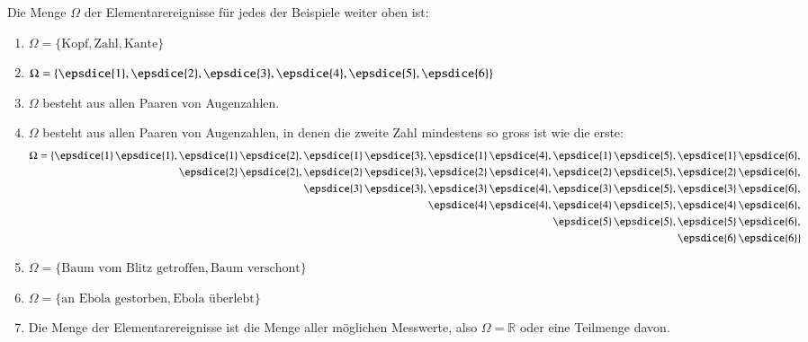 Die Menge $\Omega$ der Elementarereignisse für jedes der Beispiele weiter
oben ist:
\begin{enumerate}
\item $\Omega=\{\text{Kopf},\text{Zahl},\text{Kante}\}$
\item $\Omega=\{\epsdice{1},
\epsdice{2},
\epsdice{3},
\epsdice{4},
\epsdice{5},
\epsdice{6}\}$
\item $\Omega$ besteht aus allen Paaren von Augenzahlen.
\item $\Omega$ besteht aus allen Paaren von Augenzahlen, in denen die
zweite Zahl mindestens so gross ist wie die erste:
{
\def\e#1#2{\epsdice{#1}\,\epsdice{#2}}
\def\p{\phantom{\epsdice{1}\,\epsdice{1},\,}}
\begin{align*}
\Omega=\{
           &\e{1}{1},\e{1}{2},\e{1}{3},\e{1}{4},\e{1}{5},\e{1}{6},\\
           &\p       \e{2}{2},\e{2}{3},\e{2}{4},\e{2}{5},\e{2}{6},\\
           &\p       \p       \e{3}{3},\e{3}{4},\e{3}{5},\e{3}{6},\\
           &\p       \p       \p       \e{4}{4},\e{4}{5},\e{4}{6},\\
           &\p       \p       \p       \p       \e{5}{5},\e{5}{6},\\
           &\p       \p       \p       \p       \p       \e{6}{6}
\}
\end{align*}
}
\item $\Omega=\{\text{Baum vom Blitz getroffen},\text{Baum verschont}\}$
\item $\Omega=\{\text{an Ebola gestorben},\text{Ebola überlebt}\}$
\item Die Menge der Elementarereignisse ist die Menge aller möglichen
Messwerte, also $\Omega=\mathbb{R}$ oder eine Teilmenge davon.
\end{enumerate}

